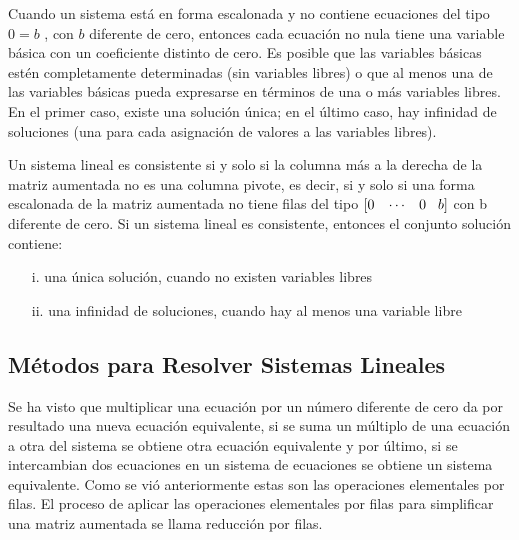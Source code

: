 \documentclass{article}
\begin{document}
Cuando un sistema está en forma escalonada y no contiene ecuaciones del tipo $0=b$ , con $b$ diferente de cero, entonces cada ecuación no nula tiene una variable básica con un coeficiente distinto de cero. Es posible que las variables básicas estén completamente determinadas (sin variables libres) o que al menos una de las variables básicas pueda expresarse en términos de una o más variables libres. En el primer caso, existe una solución única; en el último caso, hay infinidad de soluciones (una para cada asignación de valores a las variables libres).

\begin{tcolorbox}[colback=green!20!white,colframe=green!80!black,title=Teorema de Unicidad y Existencia]
    Un sistema lineal es consistente si y solo si la columna más a la derecha de la matriz aumentada no es una columna pivote, es decir, si y solo si una forma escalonada de la matriz aumentada no tiene filas del tipo
    $[0 \hspace{3 mm} \dotsb \hspace{3 mm} 0 \hspace{3 mm} b]$ con b diferente de cero.
    Si un sistema lineal es consistente, entonces el conjunto solución contiene:
    \begin{itemize}
        \item[i.] una única solución, cuando no existen variables libres
        \item[ii.]una infinidad de soluciones, cuando hay al menos una variable libre
    \end{itemize}
\end{tcolorbox}

\subsection{Métodos para Resolver Sistemas Lineales}

Se ha visto que multiplicar una ecuación por un número diferente de cero da por resultado una nueva ecuación equivalente, si se suma un múltiplo de una ecuación a otra del sistema se obtiene otra ecuación equivalente y por último, si se intercambian dos ecuaciones en un sistema de ecuaciones se obtiene un sistema equivalente. Como se vió anteriormente estas son las operaciones elementales por filas. El proceso de aplicar las operaciones elementales por filas para simplificar una matriz aumentada se llama reducción por filas. 
\end{document}
